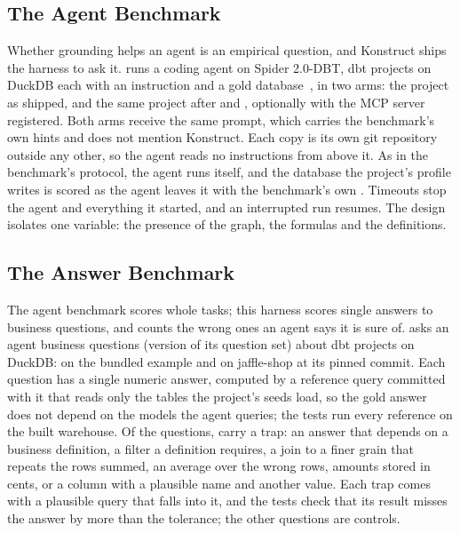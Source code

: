 \subsection{The Agent Benchmark}
\label{sec:eval-agents}

Whether grounding helps an agent is an empirical question, and Konstruct ships the harness to ask
it.  runs a coding agent on Spider 2.0-DBT, dbt projects on
DuckDB each with an instruction and a gold database~\citep{lei2025spider2}, in two arms: the
project as shipped, and the same project after  and ,
optionally with the MCP server registered. Both arms receive the same prompt, which carries the
benchmark's own hints and does not mention Konstruct. Each copy is its own git repository outside
any other, so the agent reads no instructions from above it. As in the benchmark's protocol, the
agent runs  itself, and the database the project's profile writes is scored as the
agent leaves it with the benchmark's own . Timeouts stop the agent and
everything it started, and an interrupted run resumes. The design isolates one variable: the
presence of the graph, the formulas and the definitions.

\subsection{The Answer Benchmark}
\label{sec:eval-answers}

The agent benchmark scores whole tasks; this harness scores single answers to business
questions, and counts the wrong ones an agent says it is sure of.
 asks an agent \answerQuestions{} business questions
(version \answerSetVersion{} of its question set) about \answerCorpora{} dbt projects on DuckDB:
\answerExampleQuestions{} on the bundled example and \answerJsQuestions{} on jaffle-shop at its
pinned commit. Each question has a single numeric answer, computed by a reference query committed
with it that reads only the tables the project's seeds load, so the gold answer does not depend on
the models the agent queries; the tests run every reference on the built warehouse. Of the
questions, \answerTrapQuestions{} carry a trap: an answer that depends on a business definition, a
filter a definition requires, a join to a finer grain that repeats the rows summed, an average over
the wrong rows, amounts stored in cents, or a column with a plausible name and another value. Each
trap comes with a plausible query that falls into it, and the tests check that its result misses
the answer by more than the tolerance; the other questions are controls.

